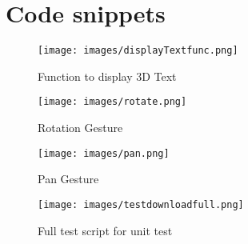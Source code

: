 \appendix
\label{ch:appendix}

\chapter{Code snippets}
\doublespacing

\begin{figure}[!htp]
	\centering
	\texttt{[image: images/displayTextfunc.png]}
	\caption{Function to display 3D Text}
	\label{fig:displayTextfunc}
\end{figure}

\begin{figure}[!htp]
	\centering
	\texttt{[image: images/rotate.png]}
	\caption{Rotation Gesture}
	\label{fig:rotate}
\end{figure}

\begin{figure}[!htp]
	\centering
	\texttt{[image: images/pan.png]}
	\caption{Pan Gesture}
	\label{fig:pan}
\end{figure}

\begin{figure}[!htp]
	\centering
	\texttt{[image: images/testdownloadfull.png]}
	\caption{Full test script for unit test}
	\label{fig:testdownloadfull}
\end{figure}